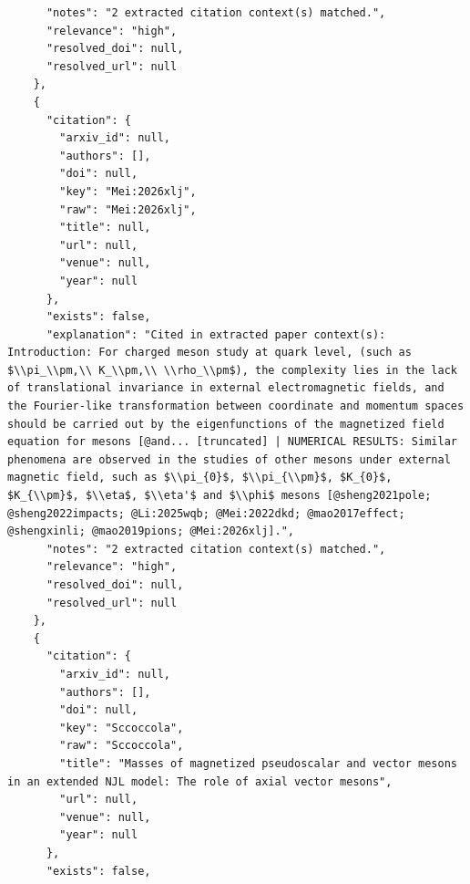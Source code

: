 \documentclass[11pt]{article}
\begin{document}
\begin{verbatim}
      "notes": "2 extracted citation context(s) matched.",
      "relevance": "high",
      "resolved_doi": null,
      "resolved_url": null
    },
    {
      "citation": {
        "arxiv_id": null,
        "authors": [],
        "doi": null,
        "key": "Mei:2026xlj",
        "raw": "Mei:2026xlj",
        "title": null,
        "url": null,
        "venue": null,
        "year": null
      },
      "exists": false,
      "explanation": "Cited in extracted paper context(s): Introduction: For charged meson study at quark level, (such as $\\pi_\\pm,\\ K_\\pm,\\ \\rho_\\pm$), the complexity lies in the lack of translational invariance in external electromagnetic fields, and the Fourier-like transformation between coordinate and momentum spaces should be carried out by the eigenfunctions of the magnetized field equation for mesons [@and... [truncated] | NUMERICAL RESULTS: Similar phenomena are observed in the studies of other mesons under external magnetic field, such as $\\pi_{0}$, $\\pi_{\\pm}$, $K_{0}$, $K_{\\pm}$, $\\eta$, $\\eta'$ and $\\phi$ mesons [@sheng2021pole; @sheng2022impacts; @Li:2025wqb; @Mei:2022dkd; @mao2017effect; @shengxinli; @mao2019pions; @Mei:2026xlj].",
      "notes": "2 extracted citation context(s) matched.",
      "relevance": "high",
      "resolved_doi": null,
      "resolved_url": null
    },
    {
      "citation": {
        "arxiv_id": null,
        "authors": [],
        "doi": null,
        "key": "Sccoccola",
        "raw": "Sccoccola",
        "title": "Masses of magnetized pseudoscalar and vector mesons in an extended NJL model: The role of axial vector mesons",
        "url": null,
        "venue": null,
        "year": null
      },
      "exists": false,

\end{verbatim}
\end{document}
